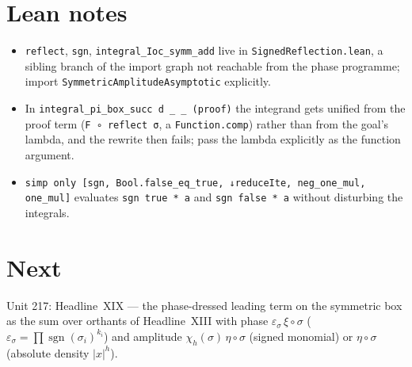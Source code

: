 \documentclass[11pt]{article}
\begin{document}
\section{Lean notes}
\begin{itemize}
\item \texttt{reflect}, \texttt{sgn}, \texttt{integral\_Ioc\_symm\_add} live in
  \texttt{SignedReflection.lean}, a sibling branch of the import graph not reachable from the
  phase programme; import \texttt{SymmetricAmplitudeAsymptotic} explicitly.
\item In \texttt{integral\_pi\_box\_succ d \_ \_ (proof)} the integrand gets unified from the proof
  term (\texttt{F ∘ reflect σ}, a \texttt{Function.comp}) rather than from the goal's lambda, and the
  rewrite then fails; pass the lambda explicitly as the function argument.
\item \texttt{simp only [sgn, Bool.false\_eq\_true, ↓reduceIte, neg\_one\_mul, one\_mul]} evaluates
  \texttt{sgn true * a} and \texttt{sgn false * a} without disturbing the integrals.
\end{itemize}

\section{Next}
Unit 217: Headline~XIX --- the phase-dressed leading term on the symmetric box as the sum over
orthants of Headline~XIII with phase $\varepsilon_\sigma\,\xi\circ\sigma$
($\varepsilon_\sigma=\prod\operatorname{sgn}(\sigma_i)^{k_i}$) and amplitude
$\chi_h(\sigma)\,\eta\circ\sigma$ (signed monomial) or $\eta\circ\sigma$ (absolute density $|x|^h$).
\end{document}
